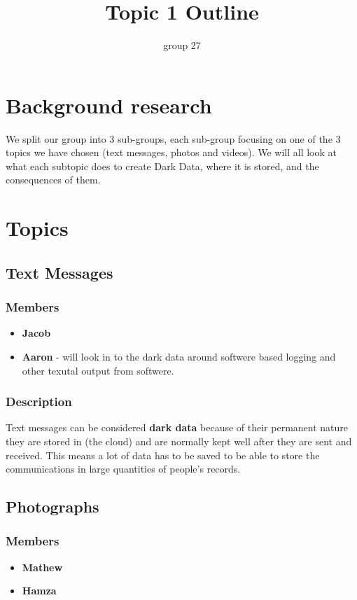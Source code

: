 \documentclass{article}
\begin{document}
\title{Topic 1 Outline}
\author{group 27}

\maketitle
\newpage

\section{Background research}
We split our group into 3 sub-groups, each sub-group focusing on one of the 3 topics we have chosen (text messages,
photos and videos). We will all look at what each subtopic does to create Dark Data, where it is stored, and the
consequences of them.

\section{Topics}
    \subsection{Text Messages} 
        \subsubsection{Members}
        \begin{itemize}
            \item \textbf{Jacob}
            \item \textbf{Aaron} - will look in to the dark data around softwere based logging and other texutal output from softwere.
        \end{itemize}
        \subsubsection{Description}
        Text messages can be considered \textbf{dark data} because of their permanent nature they are stored in (the cloud) and 
        are normally kept well after they are sent and received. This means a lot of data has to be saved to be able to
        store the communications in large quantities of people's records. 

    \subsection{Photographs}
        \subsubsection{Members}
        \begin{itemize}
            \item \textbf{Mathew}
            \item \textbf{Hamza}
        \end{itemize}
\end{document}
